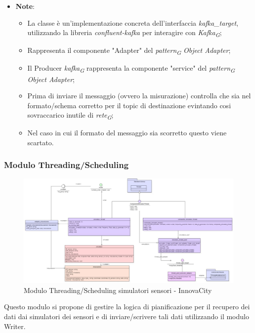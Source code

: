 \begin{itemize}
\begin{itemize}
    \item\textbf{Note}:
        \begin{itemize}
            \item La classe è un'implementazione concreta dell'interfaccia \textit{kafka\_target}, utilizzando la libreria \textit{confluent-kafka} per interagire con \textit{Kafka}\textsubscript{\textit{G}};
            \item Rappresenta il componente "Adapter" del \textit{pattern}\textsubscript{\textit{G}} \textit{Object Adapter};
            \item Il Producer \textit{kafka}\textsubscript{\textit{G}} rappresenta la componente "service" del \textit{pattern}\textsubscript{\textit{G}} \textit{Object Adapter};
            \item Prima di inviare il messaggio (ovvero la misurazione) controlla che sia nel formato/schema corretto per il topic di destinazione evintando cosi sovraccarico inutile di \textit{rete}\textsubscript{\textit{G}};
            \item Nel caso in cui il formato del messaggio sia scorretto questo viene scartato.
        \end{itemize}
    \end{itemize}
\end{itemize}

\subsubsection{Modulo Threading/Scheduling}
\begin{figure}[H]
    \centering
    \includegraphics[width=1.1\textwidth]{../Images/SpecificaTecnica/simulatorThread.PNG}
    \caption{Modulo Threading/Scheduling simulatori sensori - InnovaCity}
    \label{fig: Modulo_simulatori_sensori_thread}
\end{figure}
Questo modulo si propone di gestire la logica di pianificazione per il recupero dei dati dai simulatori dei sensori e di inviare/scrivere tali dati utilizzando il modulo Writer.

